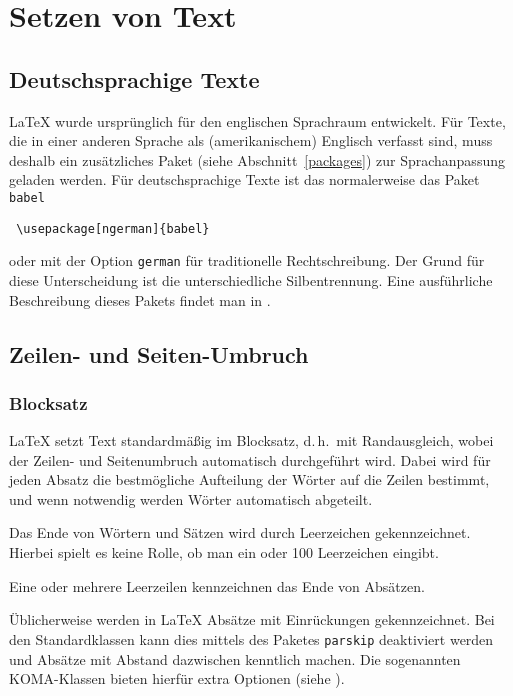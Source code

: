 
\section{Setzen von Text}


\subsection{Deutschsprachige Texte}\label{deutsch}
\LaTeX{} wurde ursprünglich für den englischen Sprachraum entwickelt.
Für Texte, die in einer anderen Sprache als (amerikanischem)
Englisch verfasst sind, muss deshalb ein zusätzliches Paket
(siehe Abschnitt~\ref{packages}) zur Sprachanpassung geladen werden.
Für deutschsprachige Texte ist das normalerweise das Paket \texttt{babel}
\begin{lstlisting}
 \usepackage[ngerman]{babel}
\end{lstlisting}
oder mit der Option \texttt{german} für traditionelle Rechtschreibung.
Der Grund für diese Unterscheidung ist die unterschiedliche Silbentrennung.
Eine ausführliche Beschreibung dieses Pakets findet man in \cite{babel}.



\subsection{Zeilen- und Seiten-Umbruch}

\subsubsection{Blocksatz}

\LaTeX{} setzt Text standardmäßig im Blocksatz, d.\,h.~mit Randausgleich,
wobei der Zeilen- und Seitenumbruch automatisch durchgeführt wird.
Dabei wird für jeden Absatz die
bestmögliche Aufteilung der Wörter auf die Zeilen bestimmt,
und wenn notwendig werden Wörter automatisch abgeteilt.
\begin{LTXexample}
Das Ende von Wörtern und
Sätzen wird durch Leerzeichen
gekennzeichnet.
Hierbei spielt es keine Rolle,
ob man ein  oder           100
Leerzeichen eingibt.

Eine oder mehrere Leerzeilen
kennzeichnen das Ende von
Absätzen.
\end{LTXexample}

Üblicherweise werden in \LaTeX{} Absätze mit Einrückungen gekennzeichnet.
Bei den Standardklassen kann dies mittels des Paketes \texttt{parskip}
deaktiviert werden und Absätze mit Abstand dazwischen kenntlich machen.
Die sogenannten KOMA-Klassen bieten hierfür extra Optionen (siehe \cite{scrguide}).


